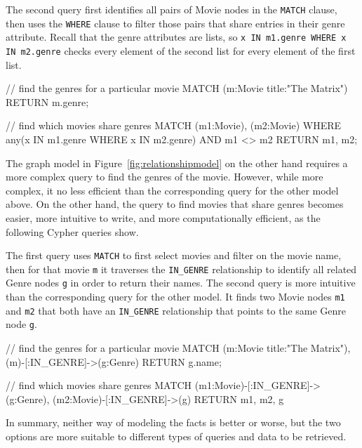 The second query first identifies all pairs of Movie nodes in the \texttt{MATCH} clause, then uses the \texttt{WHERE} clause to filter those pairs that share entries in their genre attribute. Recall that the genre attributes are lists, so \texttt{x IN m1.genre WHERE x IN m2.genre} checks every element of the second list for every element of the first list. 

\begin{samepage}
\begin{cyphercode}
// find the genres for a particular movie
MATCH (m:Movie {title:"The Matrix"})
RETURN m.genre;

// find which movies share genres
MATCH (m1:Movie), (m2:Movie)
WHERE any(x IN m1.genre 
          WHERE x IN m2.genre)
AND m1 <> m2
RETURN m1, m2;
\end{cyphercode}
\end{samepage}

The graph model in Figure~\ref{fig:relationshipmodel} on the other hand requires a more complex query to find the genres of the movie. However, while more complex, it no less efficient than the corresponding query for the other model above. On the other hand, the query to find movies that share genres becomes easier, more intuitive to write, and more computationally efficient, as the following Cypher queries show.

The first query uses \texttt{MATCH} to first select movies and filter on the movie name, then for that movie \texttt{m} it traverses the \texttt{IN\_GENRE} relationship to identify all related Genre nodes \texttt{g} in order to return their names. The second query is more intuitive than the corresponding query for the other model. It finds two Movie nodes \texttt{m1} and \texttt{m2} that both have an \texttt{IN\_GENRE} relationship that points to the same Genre node \texttt{g}. 

\begin{samepage}
\begin{cyphercode}
// find the genres for a particular movie
MATCH (m:Movie {title:"The Matrix"}),
      (m)-[:IN_GENRE]->(g:Genre)
RETURN g.name;

// find which movies share genres
MATCH (m1:Movie)-[:IN_GENRE]->(g:Genre),
      (m2:Movie)-[:IN_GENRE]->(g)
RETURN m1, m2, g
\end{cyphercode}
\end{samepage}

In summary, neither way of modeling the facts is better or worse, but the two options are more suitable to different types of queries and data to be retrieved.

